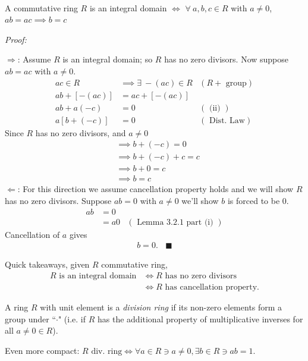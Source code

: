 \begin{example} \hspace{0.1in }\\
A commutative ring $R$ is an integral domain $\iff$ $\forall \ a,b,c \in R$ with $a\neq 0$,
$ab=ac \implies b=c$

\textit{Proof:} \steezybreak

\noindent $\Rightarrow$: Assume $R$ is an integral domain; so $R$ has no zero divisors. Now suppose
$ab=ac$ with $a\neq 0$.
\begin{align}
    ac\in R &\implies \exists \ -(ac)\in R & (R +\text{ group}) \nonumber \\
    ab+[-(ac)]&= ac + [-(ac)] & \nonumber \\
    ab+a(-c)&=0 & ( \text{ (ii) }) \nonumber \\
    a[b+(-c)]&=0 & (\text{ Dist. Law}) \nonumber
\end{align}
Since $R$ has no zero divisors, and $a\neq 0$
\begin{align}
    &\implies b+(-c)=0 \nonumber \\
    &\implies b+(-c)+c= c \nonumber \\
    &\implies b+0= c \nonumber \\
    &\implies b=c \nonumber
\end{align}
$\Leftarrow$: For this direction we assume cancellation property holds and we will show $R$ has no
zero divisors. Suppose $ab=0$ with $a\neq 0$ we'll show $b$ is forced to be $0$.
\begin{align}
    ab&=0 & \nonumber \\
    &= a0 &(\text{ Lemma 3.2.1 part (i) }) \nonumber
\end{align}
Cancellation of $a$ gives
\begin{align}
    b=0. \ \ \ \ \blacksquare \nonumber
\end{align}
\end{example}
Quick takeaways, given $R$ commutative ring,
\begin{align}
    R \text{ is an integral domain} &\iff R \text{ has no zero divisors} \nonumber \\
    &\iff R \text{ has cancellation property.} \nonumber
\end{align}

\begin{definition}
    A ring $R$ with unit element is a \textit{division ring} if its non-zero elements form a group
    under ``$\cdot$" (i.e. if $R$ has the additional property of multiplicative inverses for all
    $a\neq 0 \in R$). \steezybreak

    \noindent Even more compact:
    $R \text{ div. ring} \iff \forall a \in R \ni a\neq 0, \exists b \in R \ni ab=1$.
\end{definition}

